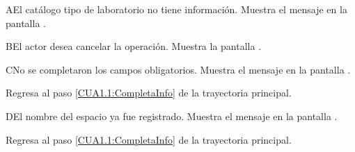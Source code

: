 \begin{UCtrayectoriaA}{A}{El catálogo tipo de laboratorio no tiene información.}
	\UCpaso [\UCsist] Muestra el mensaje  en la pantalla . 
\end{UCtrayectoriaA}

\begin{UCtrayectoriaA}{B}{El actor desea cancelar la operación.}
	\UCpaso [\UCsist] Muestra la pantalla . 
\end{UCtrayectoriaA}

\begin{UCtrayectoriaA}{C}{No se completaron los campos obligatorios.}
	\UCpaso [\UCsist] Muestra el mensaje  en la pantalla .
	
	\UCpaso Regresa al paso \ref{CUA1.1:CompletaInfo} de la trayectoria principal.
\end{UCtrayectoriaA}

\begin{UCtrayectoriaA}{D}{El nombre del espacio ya fue registrado.}
	\UCpaso [\UCsist] Muestra el mensaje  en la pantalla .
	
	\UCpaso Regresa al paso \ref{CUA1.1:CompletaInfo} de la trayectoria principal.
\end{UCtrayectoriaA}